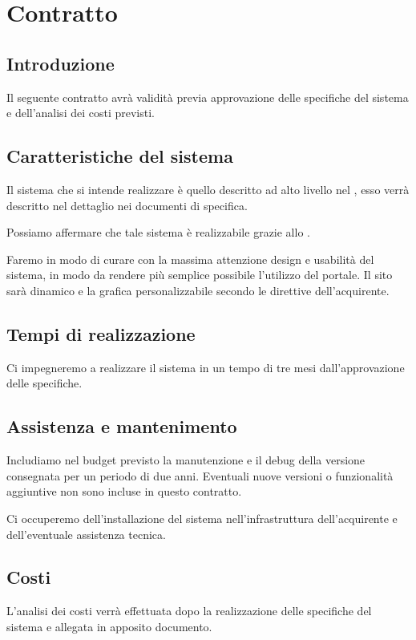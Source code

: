 \chapter{Contratto} 
\label{cha:contratto}

\section{Introduzione}
Il seguente contratto avrà validità previa approvazione delle specifiche del sistema e dell'analisi dei costi previsti.

\section{Caratteristiche del sistema} 
\label{sec:caratteristiche_del_sistema}
Il sistema che si intende realizzare è quello descritto ad alto livello nel , esso verrà descritto nel dettaglio nei documenti di specifica. 

Possiamo affermare che tale sistema è realizzabile grazie allo .

Faremo in modo di curare con la massima attenzione design e usabilità del sistema, in modo da rendere più semplice possibile l'utilizzo del portale. Il sito sarà dinamico e la grafica personalizzabile secondo le direttive dell'acquirente.


\section{Tempi di realizzazione} 
\label{sec:tempi_di_realizzazione}

Ci impegneremo a realizzare il sistema in un tempo di tre mesi dall'approvazione delle specifiche.

\section{Assistenza e mantenimento} 
\label{sec:assistenza_e_mantenimento}
Includiamo nel budget previsto la manutenzione e il debug della versione consegnata per un periodo di due anni. Eventuali nuove versioni o funzionalità aggiuntive non sono incluse in questo contratto. 

Ci occuperemo dell’installazione del sistema nell'infrastruttura dell'acquirente e dell'eventuale assistenza tecnica.


\section{Costi} 
\label{sec:costi}
L'analisi dei costi verrà effettuata dopo la realizzazione delle specifiche del sistema e allegata in apposito documento.

